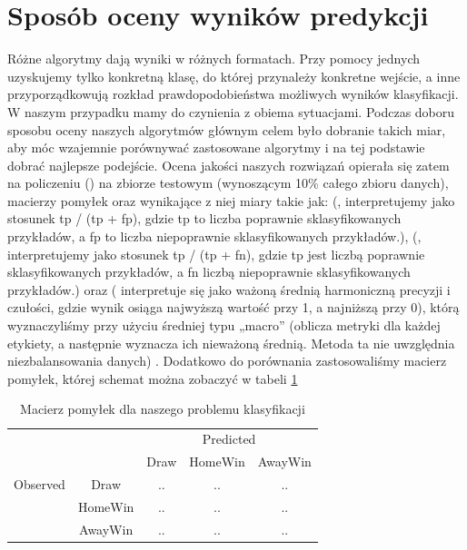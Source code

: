 \section{Sposób oceny wyników predykcji}
\label{section:ocenaWynikow}

Różne algorytmy dają wyniki w różnych formatach. Przy pomocy jednych uzyskujemy tylko konkretną klasę, do której przynależy konkretne wejście, a inne przyporządkowują rozkład prawdopodobieństwa możliwych wyników klasyfikacji. W naszym przypadku mamy do czynienia z obiema sytuacjami. Podczas doboru sposobu oceny naszych algorytmów głównym celem było dobranie takich miar, aby móc wzajemnie porównywać zastosowane algorytmy i na tej podstawie dobrać najlepsze podejście. Ocena jakości naszych rozwiązań opierała się zatem na policzeniu  () na zbiorze testowym (wynoszącym 10\% całego zbioru danych), macierzy pomyłek oraz wynikające z niej miary takie jak:  (, interpretujemy jako stosunek tp / (tp + fp), gdzie tp to liczba poprawnie sklasyfikowanych przykładów, a fp to liczba niepoprawnie sklasyfikowanych przykładów.),  (, interpretujemy jako stosunek tp / (tp + fn), gdzie tp jest liczbą poprawnie sklasyfikowanych przykładów, a fn liczbą niepoprawnie sklasyfikowanych przykładów.) oraz  ( interpretuje się jako ważoną średnią harmoniczną precyzji i czułości, gdzie wynik  osiąga najwyższą wartość przy 1, a najniższą przy 0), którą wyznaczyliśmy przy użyciu średniej typu „macro” (oblicza metryki dla każdej etykiety, a następnie wyznacza ich nieważoną średnią. Metoda ta nie uwzględnia niezbalansowania danych) \cite{SKfscore}. Dodatkowo do porównania zastosowaliśmy macierz pomyłek, której schemat można zobaczyć w tabeli \ref{tab:macierz}

\begin{center}
\begin{table}[H]
\renewcommand{\arraystretch}{1.5}
\caption{Macierz pomyłek dla naszego problemu klasyfikacji}
\label{tab:macierz}
\begin{center}
\begin{tabular}{|c|c|c|c|c|}
   \cline{3-5} 
   \multicolumn{1}{c}{} & & \multicolumn{3}{c|}{Predicted} \\ \cline{3-5}
   \multicolumn{1}{c}{} & & Draw & HomeWin & AwayWin \\ \hline
   
   {Observed}
   & Draw & .. & .. & ..  \\ \cline{2-5}
   & HomeWin & .. & .. & ..  \\ \cline{2-5}
   & AwayWin & .. & .. & .. \\ \hline
\end{tabular}
\end{center}
\end{table}
\end{center}


